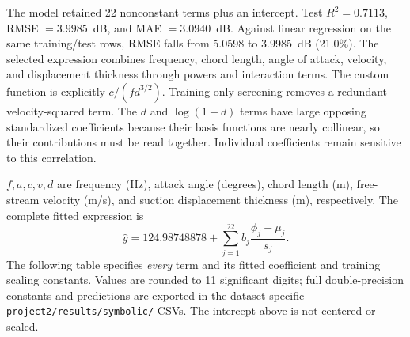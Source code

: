 \documentclass{article}
\begin{document}
The model retained 22 nonconstant terms plus an intercept. Test $R^2=0.7113$, RMSE $=3.9985$~dB, and MAE $=3.0940$~dB. Against linear regression on the same training/test rows, RMSE falls from 5.0598 to 3.9985~dB (21.0\%). The selected expression combines frequency, chord length, angle of attack, velocity, and displacement thickness through powers and interaction terms. The custom function is explicitly $c/(f d^{3/2})$. Training-only screening removes a redundant velocity-squared term. The $d$ and $\log(1+d)$ terms have large opposing standardized coefficients because their basis functions are nearly collinear, so their contributions must be read together. Individual coefficients remain sensitive to this correlation.

$f,a,c,v,d$ are frequency (Hz), attack angle (degrees), chord length (m), free-stream velocity (m/s), and suction displacement thickness (m), respectively.
The complete fitted expression is
\begin{equation}
\widehat{y}= 124.98748878 + \sum_{j=1}^{22} b_j\frac{\phi_j-\mu_j}{s_j}.
\end{equation}
The following table specifies \emph{every} term and its fitted coefficient and training scaling constants. Values are rounded to 11 significant digits; full double-precision constants and predictions are exported in the dataset-specific \texttt{project2/results/symbolic/} CSVs. The intercept above is not centered or scaled.
\end{document}
